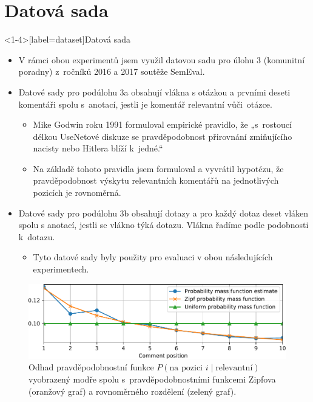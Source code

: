 \documentclass[aspectratio=169,t]{beamer}
\begin{document}
\section{Datová sada}
\begin{frame}<1-4>[label=dataset]{Datová sada}
\begin{itemize}
\item<1-> V rámci obou experimentů jsem využil datovou sadu pro úlohu 3
  (komunitní poradny) z~ročníků 2016 a 2017 soutěže SemEval.
\item<2-> Datové sady pro podúlohu 3a obsahují \alert<2-6>{vlákna s otázkou a
  prvními deseti komentáři} spolu s~anotací, jestli \alert<2-6>{je komentář
  relevantní vůči~otázce}.
  \begin{itemize}
    \item<3-> Mike Godwin roku 1991 formuloval empirické pravidlo, že
      „s~rostoucí délkou UseNetové diskuze se pravděpodobnost přirovnání
      zmiňujícího nacisty nebo Hitlera blíží k~jedné.“
    \item<4-> Na základě tohoto pravidla jsem formuloval a vyvrátil hypotézu, že
      \alert<4>{pravděpodobnost výskytu relevantních komentářů na jednotlivých
      pozicích je rovnoměrná}.
  \end{itemize}
\item<5-> Datové sady pro podúlohu 3b obsahují dotazy a \alert<5-6>{pro každý
  dotaz deset vláken} spolu s anotací, jestli se \alert<5-6>{vlákno týká dotazu}.
  Vlákna řadíme podle podobnosti k~dotazu.
  \begin{itemize}
    \item<6-> Tyto datové sady byly použity pro evaluaci v obou následujících
      experimentech.
  \end{itemize}
\end{itemize}
\end{frame}

\begin{frame}[c]
\begin{figure}
\vfill
\begin{center}
\includegraphics[scale=0.8]{figs/quality-evaluation-1}
\end{center}
\caption{Odhad pravděpodobnostní funkce $P(\text{na pozici }i\mid\text{relevantní})$
  vyobrazený modře spolu s~pravděpodobnostními funkcemi Zipfova (oranžový graf)
  a rovnoměrného rozdělení (zelený graf).}
\end{figure}
\end{frame}
\end{document}

